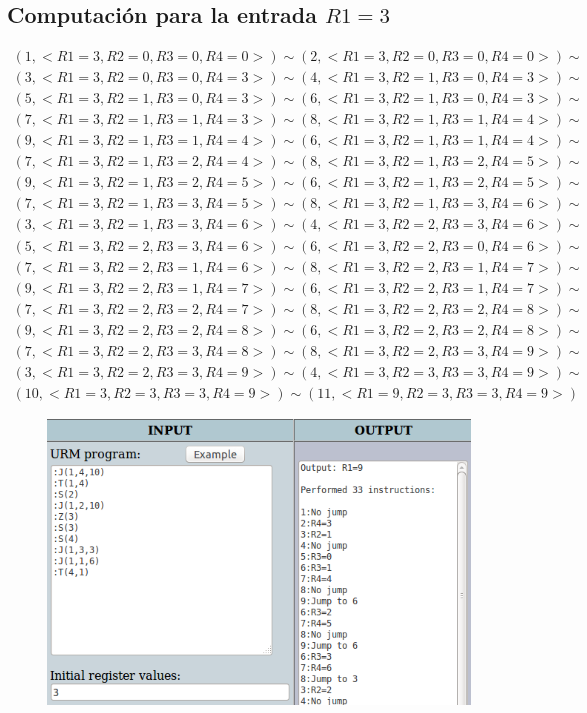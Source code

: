 		\subsection{Computación para la entrada $R1=3$}
		\begin{equation*}\begin{gathered}
		(1, <R1=3, R2=0, R3=0, R4=0>) \sim (2, <R1=3, R2=0, R3=0, R4=0>) \sim\\
		(3, <R1=3, R2=0, R3=0, R4=3>) \sim (4, <R1=3, R2=1, R3=0, R4=3>) \sim\\
		(5, <R1=3, R2=1, R3=0, R4=3>) \sim (6, <R1=3, R2=1, R3=0, R4=3>) \sim\\
		(7, <R1=3, R2=1, R3=1, R4=3>) \sim (8, <R1=3, R2=1, R3=1, R4=4>) \sim\\
		(9, <R1=3, R2=1, R3=1, R4=4>) \sim (6, <R1=3, R2=1, R3=1, R4=4>) \sim\\
		(7, <R1=3, R2=1, R3=2, R4=4>) \sim (8, <R1=3, R2=1, R3=2, R4=5>) \sim\\
		(9, <R1=3, R2=1, R3=2, R4=5>) \sim (6, <R1=3, R2=1, R3=2, R4=5>) \sim\\
		(7, <R1=3, R2=1, R3=3, R4=5>) \sim (8, <R1=3, R2=1, R3=3, R4=6>) \sim\\
		(3, <R1=3, R2=1, R3=3, R4=6>) \sim (4, <R1=3, R2=2, R3=3, R4=6>) \sim\\
		(5, <R1=3, R2=2, R3=3, R4=6>) \sim (6, <R1=3, R2=2, R3=0, R4=6>) \sim\\
		(7, <R1=3, R2=2, R3=1, R4=6>) \sim (8, <R1=3, R2=2, R3=1, R4=7>) \sim\\
		(9, <R1=3, R2=2, R3=1, R4=7>) \sim (6, <R1=3, R2=2, R3=1, R4=7>) \sim\\
		(7, <R1=3, R2=2, R3=2, R4=7>) \sim (8, <R1=3, R2=2, R3=2, R4=8>) \sim\\
		(9, <R1=3, R2=2, R3=2, R4=8>) \sim (6, <R1=3, R2=2, R3=2, R4=8>) \sim\\
		(7, <R1=3, R2=2, R3=3, R4=8>) \sim (8, <R1=3, R2=2, R3=3, R4=9>) \sim\\
		(3, <R1=3, R2=2, R3=3, R4=9>) \sim (4, <R1=3, R2=3, R3=3, R4=9>) \sim\\
		(10, <R1=3, R2=3, R3=3, R4=9>) \sim (11, <R1=9, R2=3, R3=3, R4=9>)
		\end{gathered}\end{equation*}
		\begin{figure}[H]
  			\centering
  			\includegraphics[scale=0.5]{images/43.png}
  		\end{figure}

